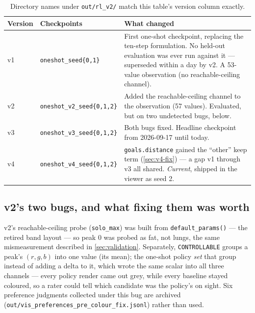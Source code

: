 \documentclass[10pt]{article}
\newcommand{\code}[1]{\texttt{#1}}
\begin{document}
\begin{table}[h]
\centering\small
\begin{tabular}{@{}lp{2.6cm}p{8.7cm}@{}}
\toprule
\textbf{Version} & \textbf{Checkpoints} & \textbf{What changed} \\
\midrule
v1 & \code{oneshot\_seed\{0,1\}} & First one-shot checkpoint, replacing the
  ten-step formulation. No held-out evaluation was ever run against it ---
  superseded within a day by v2. A 53-value observation (no
  reachable-ceiling channel). \\
v2 & \code{oneshot\_v2\_seed\{0,1,2\}} & Added the reachable-ceiling channel
  to the observation (57 values). Evaluated, but on two undetected bugs, below. \\
v3 & \code{oneshot\_v3\_seed\{0,1,2\}} & Both bugs fixed. Headline checkpoint
  from 2026-09-17 until today. \\
v4 & \code{oneshot\_v4\_seed\{0,1,2\}} & \code{goals.distance} gained the
  ``other'' keep term (\cref{sec:v4-fix}) --- a gap v1 through v3 all shared.
  \emph{Current}, shipped in the viewer as seed 2. \\
\bottomrule
\end{tabular}
\caption{Directory names under \code{out/rl\_v2/} match this table's version
column exactly.}
\end{table}

\subsection{v2's two bugs, and what fixing them was worth}

v2's reachable-ceiling probe (\code{solo\_max}) was built from
\code{default\_params()} --- the retired band layout --- so peak 0 was
probed as fat, not lungs, the same mismeasurement described in
\cref{sec:validation}. Separately, \code{CONTROLLABLE} groups a peak's
$(r,g,b)$ into one value (its mean); the one-shot policy \emph{set} that
group instead of adding a delta to it, which wrote the same scalar into all
three channels --- every policy render came out grey, while every baseline
stayed coloured, so a rater could tell which candidate was the policy's on
sight. Six preference judgments collected under this bug are archived
(\code{out/vis\_preferences\_pre\_colour\_fix.jsonl}) rather than used.
\end{document}
